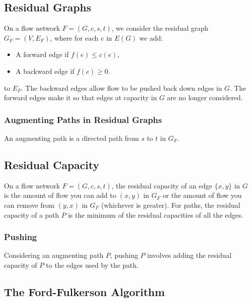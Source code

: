 \subsection{Residual Graphs}

On a flow network $F = (G, c, s, t)$, we consider the residual graph 
$G_F = (V, E_F)$, where for each $e$ in $E(G)$ we add: \begin{itemize}
  \item A forward edge if $f(e) \leq c(e)$,
  \item A backward edge if $f(e) \geq 0$.
\end{itemize} to $E_F$. The backward edges allow flow to be pushed back 
down edges in $G$. The forward edges make it so that edges at capacity in $G$ 
are no longer considered.

\subsubsection{Augmenting Paths in Residual Graphs}

An augmenting path is a directed path from $s$ to $t$ in $G_F$.

\subsection{Residual Capacity}

On a flow network $F = (G, c, s, t)$,
the residual capacity of an edge $\{x, y\}$ in $G$ is the amount of flow 
you can add to $(x, y)$ in $G_F$ or the amount of flow you can remove from 
$(y, x)$ in $G_F$ (whichever is greater). For paths, the residual
capacity of a path $P$ is the minimum of the residual capacities
of all the edges.

\subsubsection{Pushing}

Considering an augmenting path $P$, pushing $P$ involves adding the
residual capacity of $P$ to the edges used by the path.

\subsection{The Ford-Fulkerson Algorithm}

